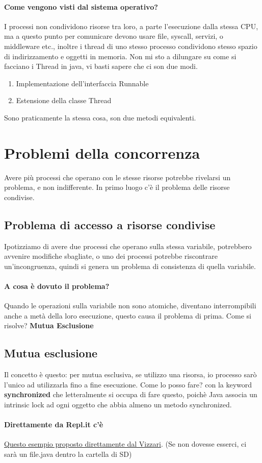\documentclass[12pt, a4paper, openany, twoside]{book}
\begin{document}
\paragraph{Come vengono visti dal sistema operativo?} I processi non condividono
risorse tra loro, a parte l'esecuzione dalla stessa CPU, ma a questo punto per 
comunicare devono usare file, syscall, servizi, o middleware etc., inoltre i
thread di uno stesso processo condividono stesso spazio di indirizzamento e oggetti
in memoria. Non mi sto a dilungare su come si facciano i Thread in java, vi basti
sapere che ci son due modi. 
\begin{enumerate}
	\item Implementazione dell'interfaccia Runnable
	\item Estensione della classe Thread
\end{enumerate}
Sono praticamente la stessa cosa, son due metodi equivalenti.
\section{Problemi della concorrenza}
Avere più processi che operano con le stesse risorse potrebbe rivelarsi un 
problema, e non indifferente. In primo luogo c'è il problema delle risorse condivise.
\subsection{Problema di accesso a risorse condivise}
Ipotizziamo di avere due processi che operano sulla stessa variabile, potrebbero
avvenire modifiche sbagliate, o uno dei processi potrebbe riscontrare un'incongruenza,
quindi si genera un problema di consistenza di quella variabile.
\paragraph{A cosa è dovuto il problema?}
Quando le operazioni sulla variabile non sono atomiche, diventano interrompibili
anche a metà della loro esecuzione, questo causa il problema di prima. Come si risolve?
\textbf{Mutua Esclusione}
\subsection{Mutua esclusione}
Il concetto è questo: per mutua esclusiva, se utilizzo una risorsa, io processo 
sarò l'unico ad utilizzarla fino a fine esecuzione. Come lo posso fare? con
la keyword \textbf{synchronized} che letteralmente si occupa di fare questo, 
poichè Java associa un intrinsic lock ad ogni oggetto che abbia almeno un metodo
synchronized.
\paragraph{Direttamente da Repl.it c'è} \href{https://repl.it/@gvizzari/ContoCorrente-sync}
{Questo esempio proposto direttamente
dal Vizzari}. (Se non dovesse esserci, ci sarà un file.java dentro la cartella di
SD)
\end{document}
